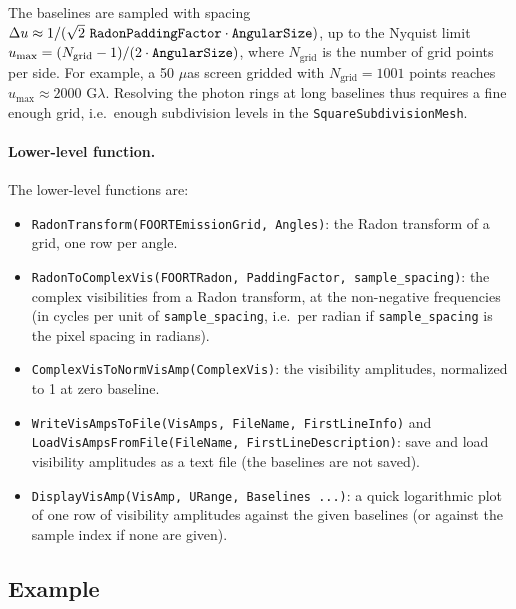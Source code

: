 \documentclass[11pt,a4paper]{article}
\newcommand{\code}[1]{{\tt #1}}
\begin{document}
The baselines are sampled with spacing $\Delta u \approx 1/(\sqrt{2}\ \code{RadonPaddingFactor}\cdot\code{AngularSize})$, up to the Nyquist limit $u_\text{max} = (N_\text{grid}-1)/(2\cdot\code{AngularSize})$, where $N_\text{grid}$ is the number of grid points per side. For example, a 50 $\mu$as screen gridded with $N_\text{grid} = 1001$ points reaches $u_\text{max}\approx 2000$ G$\lambda$. Resolving the photon rings at long baselines thus requires a fine enough grid, i.e.\ enough subdivision levels in the \code{SquareSubdivisionMesh}. 

\paragraph{Lower-level function.} The lower-level functions are:
\begin{itemize}
 \item \code{RadonTransform(FOORTEmissionGrid, Angles)}: the Radon transform of a grid, one row per angle.
 \item \code{RadonToComplexVis(FOORTRadon, PaddingFactor, sample\_spacing)}: the complex visibilities from a Radon transform, at the non-negative frequencies (in cycles per unit of \code{sample\_spacing}, i.e.\ per radian if \code{sample\_spacing} is the pixel spacing in radians).
 \item \code{ComplexVisToNormVisAmp(ComplexVis)}: the visibility amplitudes, normalized to 1 at zero baseline.
 \item \code{WriteVisAmpsToFile(VisAmps, FileName, FirstLineInfo)} and\\ \code{LoadVisAmpsFromFile(FileName, FirstLineDescription)}: save and load visibility amplitudes as a text file (the baselines are not saved).
 \item \code{DisplayVisAmp(VisAmp, URange, Baselines ...)}: a quick logarithmic plot of one row of visibility amplitudes against the given baselines (or against the sample index if none are given).
\end{itemize}

\subsection{Example}\label{sec:output example}
\end{document}
